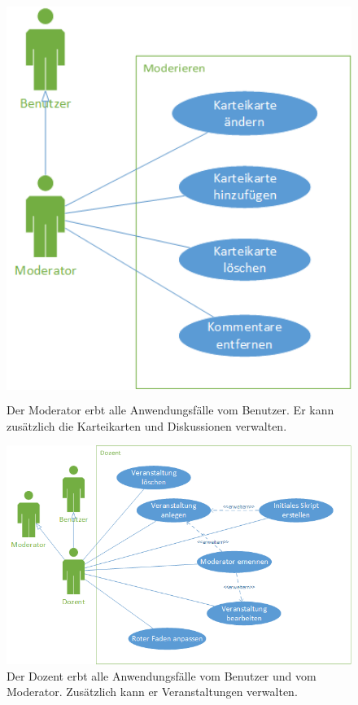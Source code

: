 \documentclass[12pt,a4paper]{article}
\begin{document}
\begin{figure}[H]
	\centering
	\includegraphics[height=13cm]{Bilder/Anwendungsfalldiagramme/Moderator.png}
	\caption{Der Moderator erbt alle Anwendungsfälle vom Benutzer. Er kann zusätzlich die Karteikarten und Diskussionen verwalten.}
	\label{AwfModerator}
\end{figure}

\begin{figure}[H]
	\centering
	\includegraphics[width=\textwidth]{Bilder/Anwendungsfalldiagramme/Dozent.png}
	\caption{Der Dozent erbt alle Anwendungsfälle vom Benutzer und vom Moderator. Zusätzlich kann er Veranstaltungen verwalten.}
	\label{AwfDozent}
\end{figure}
\end{document}

